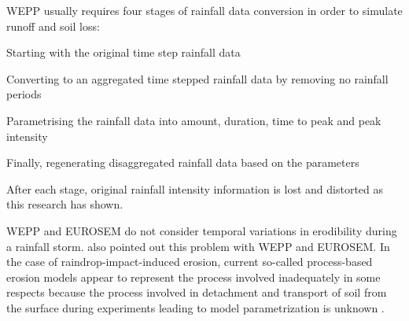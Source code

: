 WEPP usually requires four stages of rainfall data conversion in order to
simulate runoff and soil loss:
\begin{enumerate*}
  \item Starting with the original time step rainfall data
  \item Converting to an aggregated time stepped rainfall data by removing no
rainfall periods
  \item Parametrising the rainfall data into amount, duration, time to peak and
peak intensity
  \item Finally, regenerating disaggregated rainfall data based on the
parameters
\end{enumerate*}

After each stage, original rainfall intensity information is lost and distorted
as this research has shown.

WEPP and EUROSEM do not consider temporal variations in erodibility during a
rainfall storm. \citet{kinnell2005-2815} also pointed out this problem with WEPP
and EUROSEM. In the case of raindrop-impact-induced erosion, current so-called
process-based erosion models appear to represent the process involved
inadequately in some respects because the process involved in detachment and
transport of soil from the surface during experiments leading to model
parametrization is unknown \citep{kinnell2005-2815}.

%
%
%
%
%


